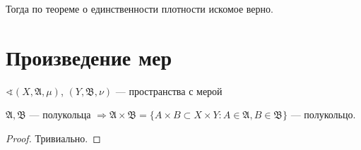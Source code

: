 Тогда по теореме о единственности плотности искомое верно.

\section{Произведение мер}

\(\sphericalangle (X, \mathfrak{A}, \mu)\), \((Y, \mathfrak{B}, \nu)\) --- пространства с мерой

\begin{lemma}
    \(\mathfrak{A}, \mathfrak{B}\) --- полукольца \( \Rightarrow \mathfrak{A} \times \mathfrak{B} = \{A \times B \subset X \times Y : A\in \mathfrak{A}, B \in \mathfrak{B}\}\) --- полукольцо.
\end{lemma}
\begin{proof}
    Тривиально. %
\end{proof}

